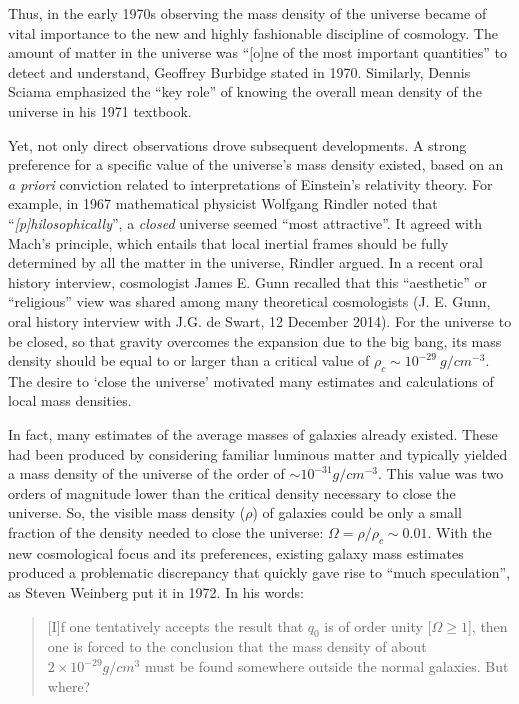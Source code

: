 \documentclass{naturefig}
\begin{document}
Thus, in the early 1970s observing the mass density of the universe became of vital importance to the new and highly fashionable discipline of cosmology. The amount of matter in the universe was ``[o]ne of the most important quantities'' to detect and understand, Geoffrey Burbidge stated in 1970.\cite{Burbidge1972} Similarly, Dennis Sciama emphasized the ``key role'' of knowing the overall mean density of the universe in his 1971 textbook.\cite{Sciama1971a}

Yet, not only direct observations drove subsequent developments. A strong preference for a specific value of the universe's mass density existed, based on an \emph{a priori} conviction related to interpretations of Einstein's relativity theory. For example, in 1967 mathematical physicist Wolfgang Rindler noted that  ``\textit{[p]hilosoph\-ically}'',  a \textit{closed} universe  seemed ``most attractive''. It agreed  with Mach's principle, which entails that local inertial frames should be fully determined by all the matter in the universe, Rindler argued.\cite{Rindler1967} In a recent oral history interview, cosmologist James E. Gunn recalled that this ``aesthetic'' or ``religious'' view was shared among many theoretical cosmologists (J. E. Gunn, oral history interview with J.G. de Swart, 12 December 2014). For the universe to be closed, so that gravity overcomes the expansion due to the big bang, its mass density should be equal to or larger than a critical value of $\rho_c  \sim 10^{-29}~g/cm^{-3}$. The desire to `close the universe' motivated many estimates and calculations of local mass densities.\cite{Peebles1967,GottJ.R.1974}

In fact, many estimates of the average masses of galaxies already existed. These had  been produced by considering familiar  luminous matter and typically yielded a mass density of the universe of the order of $\sim 10^{-31} g/cm^{-3}$.\cite{Peebles1971,Shapiro1971,Noonan1971,Weinberg1972,Burbidge1972} This value was two orders of magnitude lower than the critical density necessary to close the universe. So, the visible mass density ($\rho$) of galaxies could be only a small fraction of the density needed to close the universe: $\Omega = \rho/\rho_c \sim 0.01$. With the new cosmological focus and its preferences, existing galaxy mass estimates produced a problematic discrepancy that quickly gave rise to ``much speculation'', as Steven Weinberg put it in 1972.\cite{Weinberg1972} %
In his words:
\begin{quote}
[I]f one tentatively accepts the result that $q_0$ is of order unity [$\Omega \geq 1$], then one is forced to the conclusion that the mass density of about $2 \times 10^{-29}g/cm^3$ must be found somewhere outside the normal galaxies. But where?\cite{Weinberg1972}
\end{quote}
\end{document}

